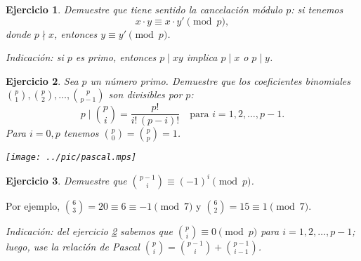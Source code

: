 \documentclass{article}
\theoremstyle{plain}
\newtheorem{ejerc}{Ejercicio}
\newif\ifsol
\begin{document}
\begin{ejerc}
\label{cancelacion}
Demuestre que tiene sentido la cancelación módulo $p$: si tenemos
$$x\cdot y \equiv x\cdot y' \pmod{p},$$
donde $p \nmid x$, entonces $y \equiv y' \pmod{p}$.
\end{ejerc}

\noindent\emph{Indicación: si $p$ es primo, entonces $p\mid xy$ implica $p\mid x$ o $p\mid y$.}

\ifsol\begin{proof}[Solución (Raúl)]
$x\cdot y \equiv x\cdot y' \pmod{p}$ significa que $p\mid (x\cdot y - x\cdot y') = x\cdot (y-y')$. Pero $p\nmid x$, y por lo tanto $p\mid (y-y')$.
\end{proof}\fi

\begin{ejerc}
\label{coeficientes-binomiales-divisibles-por-p}
Sea $p$ un número primo. Demuestre que los coeficientes binomiales ${p\choose 1}, {p \choose 2}, \ldots, {p\choose p-1}$ son divisibles por $p$:
$$p\mid {p \choose i} = \frac{p!}{i! \, (p-i)!}\quad\text{para }i = 1,2,\ldots,p-1.$$
Para $i = 0,p$ tenemos ${p\choose 0} = {p\choose p} = 1$.

\begin{center}
\texttt{[image: ../pic/pascal.mps]}
\end{center}
\end{ejerc}

\ifsol\begin{proof}[Solución (Ariel)]
Para $i = 1,2,\ldots,p-1$ en el número
$${p\choose i} = \frac{p\,(p-1)\,(p-2)\cdots (p-i+1)}{i!}$$
$p$ aparece en el numerador, pero $p \nmid i!$, y por lo tanto $p \mid {p\choose i}$.
\end{proof}\fi

\begin{ejerc}
Demuestre que ${p-1\choose i} \equiv (-1)^i \pmod{p}$.
\end{ejerc}

\noindent Por ejemplo, ${6\choose 3} = 20 \equiv 6 \equiv -1 \pmod{7}$ y ${6\choose 2} = 15 \equiv 1 \pmod{7}$.

\noindent\emph{Indicación: del ejercicio \ref{coeficientes-binomiales-divisibles-por-p} sabemos que ${p \choose i} \equiv 0 \pmod{p}$ para $i = 1,2,\ldots,p-1$; luego, use la relación de Pascal ${p \choose i} = {p-1\choose i} + {p-1 \choose i-1}$.}

\ifsol\begin{proof}[Primera solución (Dennis)]
Vamos a usar la existencia de elementos inversos módulo $p$ (véase abajo). 
Para $i = 0$ la fórmula es evidente: ${p-1\choose 0} = 1$. Para $i\ne 0$, tenemos
$${p-1\choose i} = \frac{(p-1)\,(p-2)\cdots (p-i)}{i!},$$
donde módulo $p$,
$$i! = 1\cdot 2\cdot 3\cdots i \equiv (1-p)\,(2-p)\cdots (i-p) = (-1)^i\,(p-1)\,(p-2)\cdots (p-i),$$
así que
$${p-1\choose i} = \frac{(p-1)\,(p-2)\cdots (p-i)}{i!} \equiv \frac{\cancel{(p-1)}\,\cancel{(p-2)}\cdots \cancel{(p-i)}}{(-1)^i\,\cancel{(p-1)}\,\cancel{(p-2)}\cdots \cancel{(p-i)}} = (-1)^i.$$
\end{proof}\fi
\end{document}
